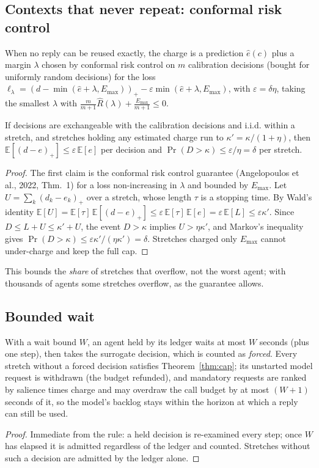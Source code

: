 \subsection{Contexts that never repeat: conformal risk control}
When no reply can be reused exactly, the charge is a prediction $\hat e(c)$ plus a margin $\lambda$
chosen by conformal risk control on $m$ calibration decisions (bought for uniformly random decisions)
for the loss $\ell_\lambda=(d-\min(\hat e+\lambda,E_{\max}))_+-\varepsilon\min(\hat e+\lambda,E_{\max})$,
with $\varepsilon=\delta\eta$, taking the smallest $\lambda$ with
$\frac{m}{m+1}\hat R(\lambda)+\frac{E_{\max}}{m+1}\le 0$.
\begin{theorem}\label{thm:crc}
If decisions are exchangeable with the calibration decisions and i.i.d. within a stretch, and stretches
holding any estimated charge run to $\kappa'=\kappa/(1+\eta)$, then
$\mathbb{E}[(d-e)_+]\le\varepsilon\,\mathbb{E}[e]$ per decision and
$\Pr(D>\kappa)\le\varepsilon/\eta=\delta$ per stretch.
\end{theorem}
\begin{proof}
The first claim is the conformal risk control guarantee (Angelopoulos et al., 2022, Thm.~1) for a loss
non-increasing in $\lambda$ and bounded by $E_{\max}$. Let $U=\sum_k(d_k-e_k)_+$ over a stretch, whose
length $\tau$ is a stopping time. By Wald's identity $\mathbb{E}[U]=\mathbb{E}[\tau]\,\mathbb{E}[(d-e)_+]
\le\varepsilon\,\mathbb{E}[\tau]\,\mathbb{E}[e]=\varepsilon\,\mathbb{E}[L]\le\varepsilon\kappa'$. Since
$D\le L+U\le\kappa'+U$, the event $D>\kappa$ implies $U>\eta\kappa'$, and Markov's inequality gives
$\Pr(D>\kappa)\le\varepsilon\kappa'/(\eta\kappa')=\delta$. Stretches charged only $E_{\max}$ cannot
under-charge and keep the full cap.
\end{proof}
This bounds the \emph{share} of stretches that overflow, not the worst agent; with thousands of agents
some stretches overflow, as the guarantee allows.

\subsection{Bounded wait}
\begin{proposition}\label{prop:wait}
With a wait bound $W$, an agent held by its ledger waits at most $W$ seconds (plus one step), then takes
the surrogate decision, which is counted as \emph{forced}. Every stretch without a forced decision
satisfies Theorem~\ref{thm:cap}; its unstarted model request is withdrawn (the budget refunded), and
mandatory requests are ranked by salience times charge and may overdraw the call budget by at most
$(W+1)$ seconds of it, so the model's backlog stays within the horizon at which a reply can still be used.
\end{proposition}
\begin{proof}
Immediate from the rule: a held decision is re-examined every step; once $W$ has elapsed it is admitted
regardless of the ledger and counted. Stretches without such a decision are admitted by the ledger alone.
\end{proof}

